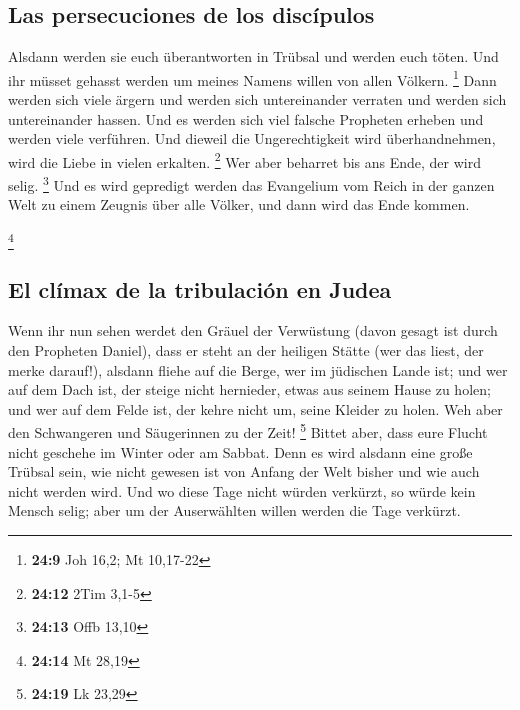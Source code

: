 \hypertarget{las-persecuciones-de-los-discuxedpulos}{%
\subsection{Las persecuciones de los
discípulos}\label{las-persecuciones-de-los-discuxedpulos}}

 Alsdann werden sie euch überantworten in Trübsal und
werden euch töten. Und ihr müsset gehasst werden um meines Namens willen
von allen Völkern. \footnote{\textbf{24:9} Joh 16,2; Mt 10,17-22}
 Dann werden sich viele ärgern und werden sich
untereinander verraten und werden sich untereinander hassen.
 Und es werden sich viel falsche Propheten erheben und
werden viele verführen.  Und dieweil die Ungerechtigkeit
wird überhandnehmen, wird die Liebe in vielen erkalten. \footnote{\textbf{24:12}
  2Tim 3,1-5}  Wer aber beharret bis ans Ende, der wird
selig. \footnote{\textbf{24:13} Offb 13,10}  Und es wird
gepredigt werden das Evangelium vom Reich in der ganzen Welt zu einem
Zeugnis über alle Völker, und dann wird das Ende kommen.

\footnote{\textbf{24:14} Mt 28,19}

\hypertarget{el-cluxedmax-de-la-tribulaciuxf3n-en-judea}{%
\subsection{El clímax de la tribulación en
Judea}\label{el-cluxedmax-de-la-tribulaciuxf3n-en-judea}}

 Wenn ihr nun sehen werdet den Gräuel der Verwüstung
(davon gesagt ist durch den Propheten Daniel), dass er steht an der
heiligen Stätte (wer das liest, der merke darauf!), 
alsdann fliehe auf die Berge, wer im jüdischen Lande ist;
 und wer auf dem Dach ist, der steige nicht hernieder,
etwas aus seinem Hause zu holen;  und wer auf dem Felde
ist, der kehre nicht um, seine Kleider zu holen.  Weh
aber den Schwangeren und Säugerinnen zu der Zeit! \footnote{\textbf{24:19}
  Lk 23,29}  Bittet aber, dass eure Flucht nicht geschehe
im Winter oder am Sabbat.  Denn es wird alsdann eine
große Trübsal sein, wie nicht gewesen ist von Anfang der Welt bisher und
wie auch nicht werden wird.  Und wo diese Tage nicht
würden verkürzt, so würde kein Mensch selig; aber um der Auserwählten
willen werden die Tage verkürzt.

